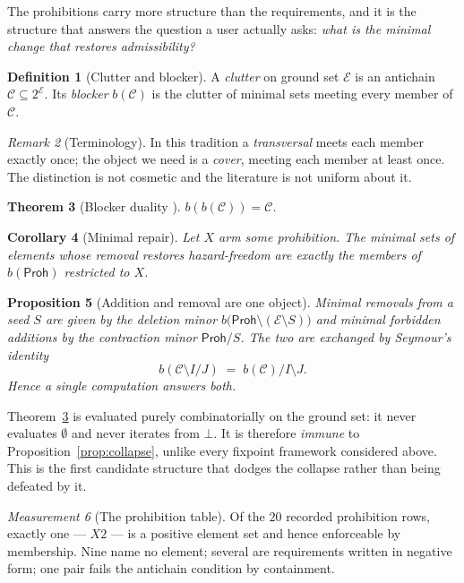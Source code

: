 \documentclass[11pt,reqno]{amsart}
\theoremstyle{plain}
\newtheorem{theorem}{Theorem}[section]
\newtheorem{proposition}[theorem]{Proposition}
\newtheorem{corollary}[theorem]{Corollary}
\theoremstyle{definition}
\newtheorem{definition}[theorem]{Definition}
\theoremstyle{remark}
\newtheorem{measurement}[theorem]{Measurement}
\newtheorem{remark}[theorem]{Remark}
\newcommand{\El}{\mathcal{E}}
\newcommand{\Haz}{\mathsf{Proh}}
\begin{document}
The prohibitions carry more structure than the requirements, and it is the
structure that answers the question a user actually asks: \emph{what is the
minimal change that restores admissibility?}

\begin{definition}[Clutter and blocker]
A \emph{clutter} on ground set $\El$ is an antichain $\mathcal{C} \subseteq 2^{\El}$.
Its \emph{blocker} $b(\mathcal{C})$ is the clutter of minimal sets meeting every
member of $\mathcal{C}$.
\end{definition}

\begin{remark}[Terminology]
In this tradition a \emph{transversal} meets each member exactly once; the object
we need is a \emph{cover}, meeting each member at least once. The distinction is
not cosmetic and the literature is not uniform about it.
\end{remark}

\begin{theorem}[Blocker duality \cite{isbell1958,edmondsfulkerson1970}]\label{thm:blocker}
$b(b(\mathcal{C})) = \mathcal{C}$.
\end{theorem}

\begin{corollary}[Minimal repair]
Let $X$ arm some prohibition. The minimal sets of elements whose removal restores
hazard-freedom are exactly the members of $b(\Haz)$ restricted to $X$.
\end{corollary}

\begin{proposition}[Addition and removal are one object]\label{prop:oneobject}
Minimal removals from a seed $S$ are given by the deletion minor
$b\bigl(\Haz \setminus (\El \setminus S)\bigr)$ and minimal forbidden additions by
the contraction minor $\Haz / S$. The two are exchanged by Seymour's identity
\[
  b(\mathcal{C} \setminus I / J) \;=\; b(\mathcal{C}) / I \setminus J .
\]
Hence a single computation answers both.
\end{proposition}

Theorem~\ref{thm:blocker} is evaluated purely combinatorially on the ground set:
it never evaluates $\emptyset$ and never iterates from $\bot$. It is therefore
\emph{immune} to Proposition~\ref{prop:collapse}, unlike every fixpoint framework
considered above. This is the first candidate structure that dodges the collapse
rather than being defeated by it.

\begin{measurement}[The prohibition table]\label{meas:clutter}
Of the $20$ recorded prohibition rows, exactly one --- $X2$ --- is a positive
element set and hence enforceable by membership. Nine name no element; several
are requirements written in negative form; one pair fails the antichain condition
by containment.
\end{measurement}
\end{document}
